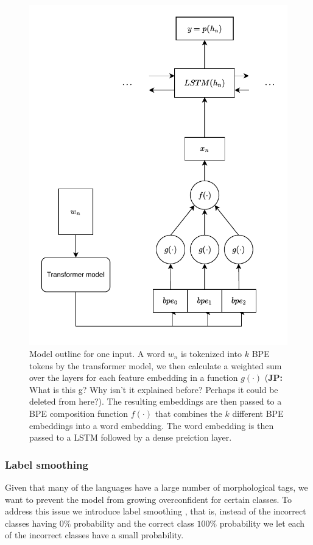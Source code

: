 \documentclass[11pt]{article}
\newcommand\jp[1]{(\textbf{JP:} #1)}
\begin{document}
	\begin{figure}%
          \centering
	\includegraphics[scale=0.5]{single_step.pdf}
    \caption{\label{fig:model} Model outline for one input. A
     word $w_n$ is tokenized into $k$ BPE tokens by the transformer
     model, we then calculate a weighted sum over the layers for each
     feature embedding in a function $g(\cdot)$ \jp{What is this g? Why isn't it explained before? Perhaps it could be deleted from here?}. The resulting
     embeddings are then passed to a BPE composition function
     $f(\cdot)$ that combines the $k$ different BPE embeddings into a
     word embedding. The word embedding is then passed to a LSTM
     followed by a dense preiction layer. }
	\end{figure}

	\subsubsection{Label smoothing}
    	Given that many of the languages have a large number of
     morphological tags, we want to prevent the model from growing
     overconfident for certain classes. To address this issue we
     introduce label smoothing \cite{szegedy2016rethinking}, that is,
     instead of the incorrect classes having $0\%$ probability and the
     correct class $100\%$ probability we let each of the incorrect
     classes have a small probability.
\end{document}
